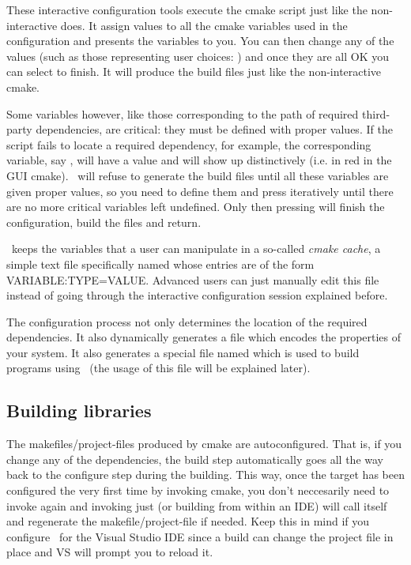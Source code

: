 These interactive configuration tools execute the cmake script just like the non-interactive  does. It assign
values to all the cmake variables used in the configuration and presents the variables to you. You can then change 
any of the values (such as those representing user choices: ) and once they are all OK you can select 
 to finish. It will produce the build files just like the non-interactive cmake.

Some variables however, like those corresponding to the path of required third-party dependencies, are critical: they 
must be defined with proper values. If the script fails to locate a required dependency, for example, the corresponding variable,
say , will have a  value and will show up distinctively (i.e. in red in the GUI cmake).
\cmake\ will refuse to generate the build files until all these variables are given proper values, so you need
to define them and press  iteratively until there are no more critical variables left undefined. Only then
pressing  will finish the configuration, build the files and return.

\begin{ccAdvanced}
\cmake\ keeps the variables that a user can manipulate in a so-called {\em cmake cache}, a simple text file specifically 
named  whose entries are of the form VARIABLE:TYPE=VALUE. Advanced users can just manually edit this 
file instead of going through the interactive configuration session explained before.
\end{ccAdvanced}


The configuration process not only determines the location of the required dependencies. It also dynamically generates a
 file which encodes the properties of your system. It also generates a special file named 
 which is used to build programs using \cgal\ (the usage of this file will be explained later).

\subsection{Building \cgal libraries}


\begin{ccAdvanced}
The makefiles/project-files produced by cmake are autoconfigured. That is, if you change any 
of the dependencies, the build step automatically goes all the way back to the configure step
during the building. This way, once the target has been configured the very first time by
invoking cmake, you don't neccesarily need to invoke  again and invoking just 
(or building from within an IDE) will call itself  and regenerate the makefile/project-file
if needed. Keep this in mind if you configure \cgal\ for the Visual Studio IDE since a build
can change the project file in place and VS will prompt you to reload it.
\end{ccAdvanced}



